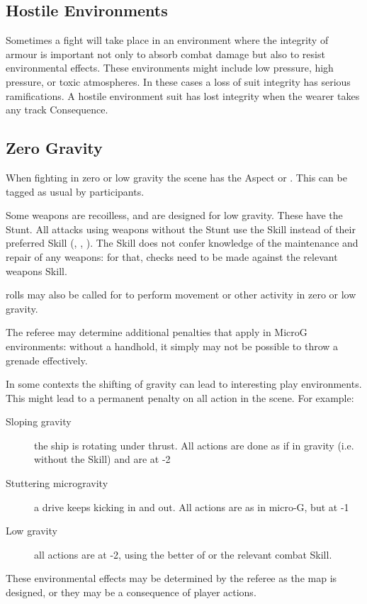 \subsection{Hostile Environments}\label{sec:hostile-environments}

Sometimes a fight will take place in an environment where the integrity of armour is important not only to absorb combat damage but also to resist environmental effects. These environments might include low pressure, high pressure, or toxic atmospheres. In these cases a loss of suit integrity has serious ramifications. A hostile environment suit has lost integrity when the wearer takes any \Health{} track Consequence.

\subsection{Zero Gravity}\label{sec:zero-gravity}

When fighting in zero or low gravity the scene has the Aspect  or . This can be tagged as usual by participants.

Some weapons are recoilless, and are designed for low gravity. These have the  Stunt. All attacks using weapons without the  Stunt use the  Skill instead of their preferred Skill (, , ). The  Skill does not confer knowledge of the maintenance and repair of any weapons: for that, checks need to be made against the relevant weapons Skill.

 rolls may also be called for to perform movement or other activity in zero or low gravity.

The referee may determine additional penalties that apply in MicroG environments: without a handhold, it simply may not be possible to throw a grenade effectively.

In some contexts the shifting of gravity can lead to interesting play environments. This might lead to a permanent penalty on all action in the scene. For example:
\begin{description}
\item [Sloping gravity]
the ship is rotating under thrust. All actions are done as if in gravity (i.e. without the  Skill) and are at -2
\item [Stuttering microgravity]
a drive keeps kicking in and out. All actions are as in micro-G, but at -1
\item [Low gravity]
all actions are at -2, using the better of  or the relevant combat Skill.
\end{description}

These environmental effects may be determined by the referee as the map is designed, or they may be a consequence of player actions.

